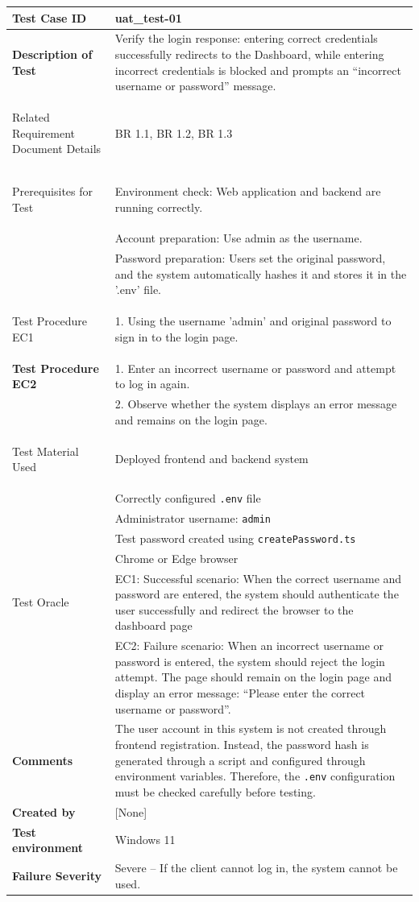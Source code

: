 \begin{table}[h]
\begin{tabularx}{\linewidth}{>{\bfseries}l X}
\hline
Test Case ID & uat\_test-01 \\ \hline
Description of Test & Verify the login response: entering correct credentials successfully redirects to the Dashboard, while entering incorrect credentials is blocked and prompts an “incorrect username or password” message.\\ \hline

Related Requirement Document Details & BR 1.1, BR 1.2, BR 1.3\\ \hline

Prerequisites for Test & Environment check: Web application and backend are running correctly. \\
&Account preparation: Use admin as the username. \\
&Password preparation: Users set the original password, and the system automatically hashes it and stores it in the '.env' file.\\ \hline

Test Procedure EC1 & 1. Using the username 'admin' and original password to sign in to the login page. \\ \hline
Test Procedure EC2& 1. Enter an incorrect username or password and attempt to log in again. \\ 
 & 2. Observe whether the system displays an error message and remains on the login page.\\ \hline

Test Material Used & Deployed frontend and backend system \\
&Correctly configured \texttt{.env} file \\
&Administrator username: \texttt{admin} \\
&Test password created using \texttt{createPassword.ts} \\
&Chrome or Edge browser \\ \hline

Test Oracle  & EC1: Successful scenario: When the correct username and password are entered, the system should authenticate the user successfully and redirect the browser to the dashboard page\\
& EC2: Failure scenario: When an incorrect username or password is entered, the system should reject the login attempt. The page should remain on the login page and display an error message: “Please enter the correct username or password”.\\ \hline
Comments & The user account in this system is not created through frontend registration. Instead, the password hash is generated through a script and configured through environment variables. Therefore, the \texttt{.env} configuration must be checked carefully before testing. \\ \hline
\textbf{Created by} & 
[None] \\ \hline
\textbf{Test environment} & 
Windows 11 \\ \hline
Failure Severity & Severe – If the client cannot log in, the system cannot be used.\\ \hline
\end{tabularx}
\end{table}


